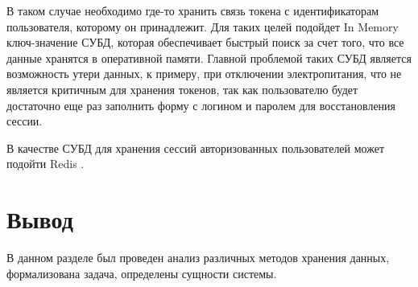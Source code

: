 В таком случае необходимо где-то хранить связь токена с идентификаторам пользователя, которому он принадлежит. Для таких целей подойдет In Memory ключ-значение СУБД, которая обеспечивает быстрый поиск за счет того, что все данные хранятся в оперативной памяти. Главной проблемой таких СУБД является возможность утери данных, к примеру, при отключении электропитания, что не является критичным для хранения токенов, так как пользователю будет достаточно еще раз заполнить форму с логином и паролем для восстановления сессии.

В качестве СУБД для хранения сессий авторизованных пользователей может подойти Redis \cite{redis}.

\section*{Вывод}

В данном разделе был проведен анализ различных методов хранения данных, формализована задача, определены сущности системы.
